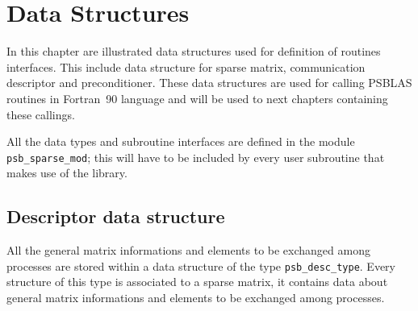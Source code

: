 \section{Data Structures}
\label{sec:datastruct}

In this chapter are illustrated data structures used for definition of
routines interfaces. This include data structure for sparse matrix,
communication descriptor and preconditioner. These data structures are used for
calling PSBLAS routines in Fortran~90 language and will be used to next
chapters containing these callings. 

All the data types and subroutine interfaces are defined in the module
\verb|psb_sparse_mod|; this will have to be included by every user
subroutine that makes use of the library. 



\subsection{Descriptor data structure}
\label{sec:desc}
All the general matrix informations and elements to be
exchanged among processes are stored within a data structure of the
type \hypertarget{descdata}{{\tt psb\_desc\_type}}. 
Every structure of this type is associated to a sparse matrix, it
contains data about general matrix informations and elements to be
exchanged among processes.  

